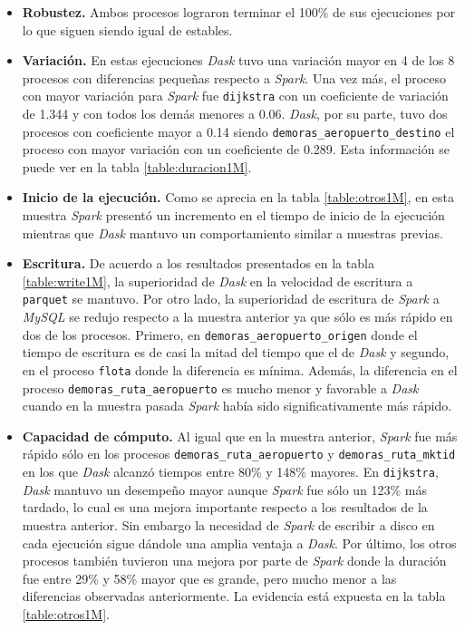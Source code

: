 \begin{itemize}
	\item \textbf{Robustez.} Ambos procesos lograron terminar el 100\% de sus ejecuciones por lo que siguen siendo igual de estables.
	
	\item \textbf{Variación.} En estas ejecuciones \textit{Dask} tuvo una variación mayor en 4 de los 8 procesos con diferencias pequeñas respecto a \textit{Spark}. Una vez más, el proceso con mayor variación para \textit{Spark} fue \texttt{dijkstra} con un coeficiente de variación de 1.344 y con todos los demás menores a 0.06. \textit{Dask}, por su parte, tuvo dos procesos con coeficiente mayor a 0.14 siendo \texttt{demoras\_aeropuerto\_destino} el proceso con mayor variación con un coeficiente de 0.289. Esta información se puede ver en la tabla \ref{table:duracion1M}.
	
	\item \textbf{Inicio de la ejecución.} Como se aprecia en la tabla \ref{table:otros1M}, en esta muestra \textit{Spark} presentó un incremento en el tiempo de inicio de la ejecución mientras que \textit{Dask} mantuvo un comportamiento similar a muestras previas. 
	
	\item \textbf{Escritura.} De acuerdo a los resultados presentados en la tabla \ref{table:write1M}, la superioridad de \textit{Dask} en la velocidad de escritura a \texttt{parquet} se mantuvo. Por otro lado, la superioridad de escritura de \textit{Spark} a \textit{MySQL} se redujo respecto a la muestra anterior ya que sólo es más rápido en dos de los procesos. Primero, en \texttt{demoras\_aeropuerto\_origen} donde el tiempo de escritura es de casi la mitad del tiempo que el de \textit{Dask} y segundo, en el proceso \texttt{flota} donde la diferencia es mínima. Además, la diferencia en el proceso \texttt{demoras\_ruta\_aeropuerto} es mucho menor y favorable a \textit{Dask} cuando en la muestra pasada \textit{Spark} había sido significativamente más rápido. 
	
	\item \textbf{Capacidad de cómputo.} Al igual que en la muestra anterior, \textit{Spark} fue más rápido sólo en los procesos \texttt{demoras\_ruta\_aeropuerto} y \texttt{demoras\_ruta\_mktid} en los que \textit{Dask} alcanzó tiempos entre 80\% y 148\% mayores. En \texttt{dijkstra}, \textit{Dask} mantuvo un desempeño mayor aunque \textit{Spark} fue sólo un 123\% más tardado, lo cual es una mejora importante respecto a los resultados de la muestra anterior. Sin embargo la necesidad de \textit{Spark} de escribir a disco en cada ejecución sigue dándole una amplia ventaja a \textit{Dask}. Por último, los otros procesos también tuvieron una mejora por parte de \textit{Spark} donde la duración fue entre 29\% y 58\% mayor que es grande, pero mucho menor a las diferencias observadas anteriormente. La evidencia está expuesta en la tabla \ref{table:otros1M}.
	

\end{itemize}
